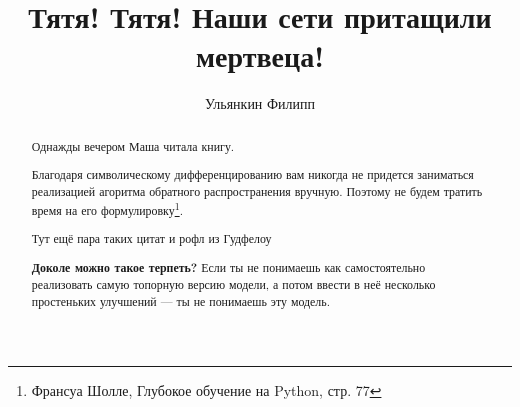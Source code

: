 \documentclass[12pt, a4paper, oneside]{article}
\title{Тятя! Тятя! Наши сети притащили мертвеца!}
\date{ }
\author{Ульянкин Филипп}
\theoremstyle{plain} %
\theoremstyle{definition}
\newcommand{\indef}[1]{\textbf{ \color{green} #1}}
\begin{document}
\toggletrue{lecture}

\maketitle
	
\begin{abstract}
   Однажды вечером Маша читала книгу. 
   
   Благодаря символическому дифференцированию вам никогда не придется заниматься реализацией агоритма обратного распространения вручную. Поэтому не будем тратить время на его формулировку\footnote{Франсуа Шолле, Глубокое обучение на Python, стр. 77}.
   
   Тут ещё пара таких цитат и рофл из Гудфелоу
   
   \indef{Доколе можно такое терпеть?} Если ты не понимаешь как самостоятельно реализовать самую топорную версию модели, а потом ввести в неё несколько простеньких улучшений --- ты не понимаешь эту модель.
    
    
    
    
    
\end{abstract}
	
\end{document}
